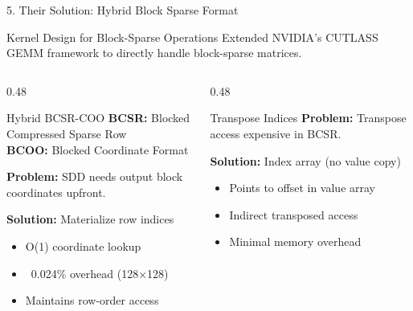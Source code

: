 \documentclass[11pt]{beamer}
\begin{document}
\begin{frame}[fragile]{5. Their Solution: Hybrid Block Sparse Format}
    \begin{block}{Kernel Design for Block-Sparse Operations}
    \scriptsize
    Extended NVIDIA's CUTLASS GEMM framework to directly handle block-sparse matrices.
    \end{block}
    
    \begin{columns}[t]
    \begin{column}{0.48\textwidth}
        \begin{block}{Hybrid BCSR-COO}
        \scriptsize
        \textbf{BCSR:} Blocked Compressed Sparse Row \\
        \textbf{BCOO:} Blocked Coordinate Format
        
        \vspace{0.1cm}
        \textbf{Problem:} SDD needs output block coordinates upfront.
        
        \textbf{Solution:} Materialize row indices
        \begin{itemize}
            \scriptsize
            \item O(1) coordinate lookup
            \item ~0.024\% overhead (128×128)
            \item Maintains row-order access
        \end{itemize}
        \end{block}
    \end{column}
    
    \begin{column}{0.48\textwidth}
        \begin{block}{Transpose Indices}
        \scriptsize
        \textbf{Problem:} Transpose access expensive in BCSR.
        
        \textbf{Solution:} Index array (no value copy)
        \begin{itemize}
            \scriptsize
            \item Points to offset in value array
            \item Indirect transposed access
            \item Minimal memory overhead
        \end{itemize}
        \end{block}
    \end{column}
    \end{columns}
\end{frame}
\end{document}
